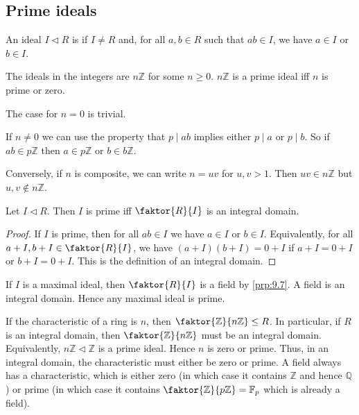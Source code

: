 \subsection{Prime ideals}
\begin{definition}
	An ideal $I \triangleleft R$ is  if $I \neq R$ and, for all $a,b \in R$ such that $ab \in I$, we have $a \in I$ or $b \in I$.
\end{definition}

\begin{example}
	The ideals in the integers are $n \mathbb{Z}$ for some $n \geq 0$.
	$n\mathbb Z$ is a prime ideal iff $n$ is prime or zero.

	The case for $n = 0$ is trivial.

	If $n \neq 0$ we can use the property that $p \mid ab$ implies either $p \mid a$ or $p \mid b$.
	So if $ab \in p \mathbb{Z}$ then $a \in p \mathbb{Z}$ or $b \in b \mathbb{Z}$.

	Conversely, if $n$ is composite, we can write $n = uv$ for $u, v > 1$.
	Then $uv \in n\mathbb Z$ but $u,v \not\in n\mathbb Z$.
\end{example}

\begin{proposition} \label{prp:9.8}
	Let $I \triangleleft R$.
	Then $I$ is prime iff $\faktor{R}{I}$ is an integral domain.
\end{proposition}

\begin{proof}
	If $I$ is prime, then for all $ab \in I$ we have $a \in I$ or $b \in I$.
	Equivalently, for all $a + I, b + I \in \faktor{R}{I}$, we have $(a+I)(b+I) = 0+I$ if $a+I = 0+I$ or $b+I = 0+I$.
	This is the definition of an integral domain.
\end{proof}

\begin{remark}
	If $I$ is a maximal ideal, then $\faktor{R}{I}$ is a field by \cref{prp:9.7}.
	A field is an integral domain.
	Hence any maximal ideal is prime.
\end{remark}

\begin{remark}
	If the characteristic of a ring is $n$, then $\faktor{\mathbb Z}{n\mathbb Z} \leq R$.
	In particular, if $R$ is an integral domain, then $\faktor{\mathbb Z}{n\mathbb Z}$ must be an integral domain.
	Equivalently, $n\mathbb Z \triangleleft \mathbb Z$ is a prime ideal.
	Hence $n$ is zero or prime.
	Thus, in an integral domain, the characteristic must either be zero or prime.
	A field always has a characteristic, which is either zero (in which case it contains $\mathbb Z$ and hence $\mathbb Q$) or prime (in which case it contains $\faktor{\mathbb Z}{p\mathbb Z} = \mathbb F_p$ which is already a field).
\end{remark}
